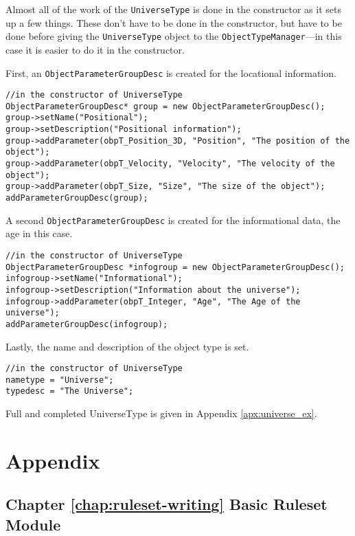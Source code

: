 \documentclass[a4paper,11pt]{report}
\newcommand{\codename}[1]{\texttt{#1}}
\begin{document}
Almost all of the work of the \codename{UniverseType} is done in the constructor as it sets up a few things. These don't have to be done in the constructor, but have to be done before giving the \codename{UniverseType} object to the \codename{ObjectTypeManager}---in this case it is easier to do it in the constructor.

First, an \codename{ObjectParameterGroupDesc} is created for the locational information.

\begin{verbatim}
//in the constructor of UniverseType
ObjectParameterGroupDesc* group = new ObjectParameterGroupDesc();
group->setName("Positional");
group->setDescription("Positional information");
group->addParameter(obpT_Position_3D, "Position", "The position of the object");
group->addParameter(obpT_Velocity, "Velocity", "The velocity of the object");
group->addParameter(obpT_Size, "Size", "The size of the object");
addParameterGroupDesc(group);
\end{verbatim}



A second \codename{ObjectParameterGroupDesc} is created for the informational data, the age in this case.

\begin{verbatim}
//in the constructor of UniverseType
ObjectParameterGroupDesc *infogroup = new ObjectParameterGroupDesc();
infogroup->setName("Informational");
infogroup->setDescription("Information about the universe");
infogroup->addParameter(obpT_Integer, "Age", "The Age of the universe");
addParameterGroupDesc(infogroup);
\end{verbatim}

Lastly, the name and description of the object type is set.

\begin{verbatim}
//in the constructor of UniverseType
nametype = "Universe";
typedesc = "The Universe";
\end{verbatim}

Full and completed UniverseType is given in Appendix \ref{apx:universe_ex}.



\appendix
\part{Appendix}
\label{part:appendix}

\chapter{Chapter \ref{chap:ruleset-writing} Basic Ruleset Module}
\label{apx:emptyruleset_ex}
\end{document}
